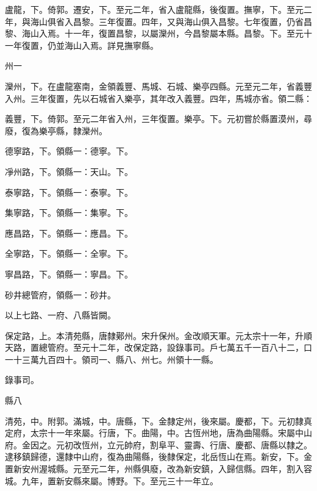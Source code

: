 \begin{pinyinscope}
 盧龍，下。倚郭。遷安，下。至元二年，省入盧龍縣，後復置。撫寧，下。至元二年，與海山俱省入昌黎。三年復置。四年，又與海山俱入昌黎。七年復置，仍省昌黎、海山入焉。十一年，復置昌黎，以屬灤州，今昌黎屬本縣。昌黎。下。至元十一年復置，仍並海山入焉。詳見撫寧縣。



 州一



 灤州，下。在盧龍塞南，金領義豐、馬城、石城、樂亭四縣。元至元二年，省義豐入州。三年復置，先以石城省入樂亭，其年改入義豐。四年，馬城亦省。領二縣：



 義豐，下。倚郭。至元二年省入州，三年復置。樂亭。下。元初嘗於縣置漠州，尋廢，復為樂亭縣，隸灤州。



 德寧路，下。領縣一：德寧。下。



 凈州路，下。領縣一：天山。下。



 泰寧路，下。領縣一：泰寧。下。



 集寧路，下。領縣一：集寧。下。



 應昌路，下。領縣一：應昌。下。



 全寧路，下。領縣一：全寧。下。



 寧昌路，下。領縣一：寧昌。下。



 砂井總管府，領縣一：砂井。



 以上七路、一府、八縣皆闕。



 保定路，上。本清苑縣，唐隸鄚州。宋升保州。金改順天軍。元太宗十一年，升順天路，置總管府。至元十二年，改保定路，設錄事司。戶七萬五千一百八十二，口一十三萬九百四十。領司一、縣八、州七。州領十一縣。



 錄事司。



 縣八



 清苑，中。附郭。滿城，中。唐縣，下。金隸定州，後來屬。慶都，下。元初隸真定府，太宗十一年來屬。行唐，下。曲陽，中。古恆州地，唐為曲陽縣。宋屬中山府。金因之。元初改恆州，立元帥府，割阜平、靈壽、行唐、慶都、唐縣以隸之。逮移鎮歸德，還隸中山府，復為曲陽縣，後隸保定，北岳恆山在焉。新安，下。金置新安州渥城縣。元至元二年，州縣俱廢，改為新安鎮，入歸信縣。四年，割入容城。九年，置新安縣來屬。博野。下。至元三十一年立。




\end{pinyinscope}
